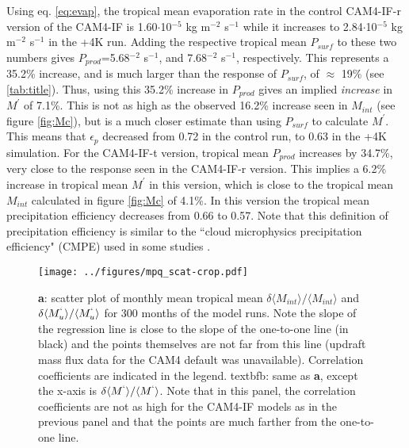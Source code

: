 \documentclass[letterpaper,12pt,titlepage,oneside,final]{book}
\begin{document}
Using eq. \ref{eq:evap}, the tropical mean evaporation rate in the control CAM4-IF-r version of the CAM4-IF is 1.60$\cdot$10$^{-5}$ kg m$^{-2}$ s$^{-1}$ while it increases to 2.84$\cdot$10$^{-5}$ kg m$^{-2}$ s$^{-1}$ in the +4K run. Adding the respective tropical mean $P_{surf}$ to these two numbers gives $P_{prod}$=5.68$^{-2}$ s$^{-1}$, and 7.68$^{-2}$ s$^{-1}$, respectively. This represents a 35.2\% increase, and is much larger than the response of $P_{surf}$, of $\approx$ 19\% (see \ref{tab:title}). Thus, using this 35.2\% increase in $P_{prod}$ gives an implied \textit{increase} in $M^{'}$ of 7.1\%. This is not as high as the observed 16.2\% increase seen in $M_{int}$ (see figure \ref{fig:Mc}), but is a much closer estimate than using $P_{surf}$ to calculate $M^{'}$. This means that $\epsilon_{p}$ decreased from 0.72 in the control run, to 0.63 in the +4K simulation. For the CAM4-IF-t version, tropical mean $P_{prod}$ increases by 34.7\%, very close to the response seen in the CAM4-IF-r version. This implies a 6.2\% increase in tropical mean $M^{'}$ in this version, which is close to the tropical mean $M_{int}$ calculated in figure \ref{fig:Mc} of 4.1\%. In this version the tropical mean precipitation efficiency decreases from 0.66 to 0.57. Note that this definition of precipitation efficiency is similar to the ``cloud microphysics precipitation efficiency" (CMPE) used in some studies \citep{schoenberg_ferrier_factors_1996,sui_definition_2007}.

\begin{figure}[H]
\centering
\noindent\texttt{[image: ../figures/mpq\_scat-crop.pdf]}\hfill
\caption{\textbf{a}: scatter plot of monthly mean tropical mean $\delta{\langle{M_{int}}}\rangle/\langle{M_{int}}\rangle$ and $\delta{\langle{M_{u}^{`}}}\rangle/\langle{M_{u}^{`}}\rangle$ for 300 months of the model runs. Note the slope of the regression line is close to the slope of the one-to-one line (in black) and the points themselves are not far from this line (updraft mass flux data for the CAM4 default was unavailable). Correlation coefficients are indicated in the legend. textbf{b}: same as \textbf{a}, except the x-axis is $\delta{\langle{M^{`}}}\rangle/\langle{M^{`}}\rangle$. Note that in this panel, the correlation coefficients are not as high for the CAM4-IF models as in the previous panel and that the points are much farther from the one-to-one line.   }
\end{figure}
\end{document}
